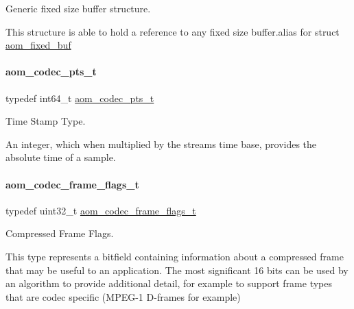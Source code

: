 Generic fixed size buffer structure. 

This structure is able to hold a reference to any fixed size buffer.\+alias for struct \hyperlink{structaom__fixed__buf}{aom\+\_\+fixed\+\_\+buf} \mbox{\label{group__encoder_ga958524226c9a65251c9e4f7bb78fc606}} 
\paragraph{\texorpdfstring{aom\+\_\+codec\+\_\+pts\+\_\+t}{aom\_codec\_pts\_t}}
{\footnotesize\ttfamily typedef int64\+\_\+t \hyperlink{group__encoder_ga958524226c9a65251c9e4f7bb78fc606}{aom\+\_\+codec\+\_\+pts\+\_\+t}}



Time Stamp Type. 

An integer, which when multiplied by the stream\textquotesingle{}s time base, provides the absolute time of a sample. \mbox{\label{group__encoder_gaf776d31e60e32bee1cdbaf052a8ea12a}} 
\paragraph{\texorpdfstring{aom\+\_\+codec\+\_\+frame\+\_\+flags\+\_\+t}{aom\_codec\_frame\_flags\_t}}
{\footnotesize\ttfamily typedef uint32\+\_\+t \hyperlink{group__encoder_gaf776d31e60e32bee1cdbaf052a8ea12a}{aom\+\_\+codec\+\_\+frame\+\_\+flags\+\_\+t}}



Compressed Frame Flags. 

This type represents a bitfield containing information about a compressed frame that may be useful to an application. The most significant 16 bits can be used by an algorithm to provide additional detail, for example to support frame types that are codec specific (M\+P\+E\+G-\/1 D-\/frames for example) \mbox{\label{group__encoder_ga5f326af84993f371bb165883bb5a5a59}} 
